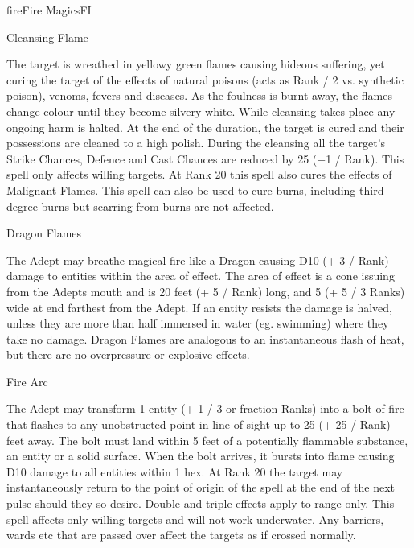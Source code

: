 \begin{College}[2.0]{fire}{Fire Magics}{FI}
\begin{spell}[S-1]{Cleansing Flame}
\begin{effects}
The target is wreathed in yellowy green flames causing hideous
suffering, yet curing the target of the effects of natural poisons
(acts as Rank / 2 vs. synthetic poison), venoms, fevers and
diseases. As the foulness is burnt away, the flames change colour
until they become silvery white.  While cleansing takes place any
ongoing harm is halted.  At the end of the duration, the target is
cured and their possessions are cleaned to a high polish.  During the
cleansing all the target’s Strike Chances, Defence and Cast Chances
are reduced by 25 (−1 / Rank).  This spell only affects willing
targets. At Rank 20 this spell also cures the effects of Malignant
Flames. This spell can also be used to cure burns, including third
degree burns but scarring from burns are not affected.
\end{effects}
\end{spell}


\begin{spell}[S-2]{Dragon Flames}
\begin{effects}
The Adept may breathe magical fire like a Dragon causing D10 (+ 3 /
Rank) damage to entities within the area of effect. The area of effect
is a cone issuing from the Adepts mouth and is 20 feet (+ 5 / Rank)
long, and 5 (+ 5 / 3 Ranks) wide at end farthest from the Adept. If an
entity resists the damage is halved, unless they are more than half
immersed in water (eg. swimming) where they take no damage.  Dragon
Flames are analogous to an instantaneous flash of heat, but there are
no overpressure or explosive effects.
\end{effects}
\end{spell}

\begin{spell}[S-3]{Fire Arc}

\begin{effects}
The Adept may transform 1 entity (+ 1 / 3 or fraction Ranks) into a
bolt of fire that flashes to any unobstructed point in line of sight
up to 25 (+ 25 / Rank) feet away. The bolt must land within 5 feet of
a potentially flammable substance, an entity or a solid surface.  When
the bolt arrives, it bursts into flame causing D10 damage to all
entities within 1 hex.  At Rank 20 the target may instantaneously
return to the point of origin of the spell at the end of the next
pulse should they so desire.  Double and triple effects apply to range
only. This spell affects only willing targets and will not work
underwater. Any barriers, wards etc that are passed over affect the
targets as if crossed normally.
\end{effects}
\end{spell}


\end{College}
